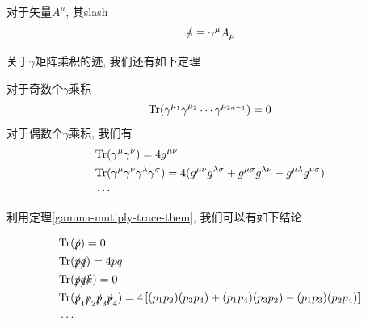 \begin{definition}[Slash]
    对于矢量$A^\mu$, 其slash
    \begin{equation}
        \slashed A\equiv \gamma^\mu A_\mu
    \end{equation}
\end{definition}

关于$\gamma$矩阵乘积的迹, 我们还有如下定理\cite{griffthsClifford}
\begin{theorem}\label{gamma-mutiply-trace-them}
    对于奇数个$\gamma$乘积
    \begin{equation}
        \rm{Tr}(\gamma^{\mu_1}\gamma^{\mu_2}\cdots\gamma^{\mu_{2n-1}})=0
    \end{equation}
    对于偶数个$\gamma$乘积, 我们有
    \begin{align}
        &\rm{Tr}(\gamma^\mu\gamma^\nu)=4g^{\mu\nu}\\
        &\rm{Tr}(\gamma^\mu\gamma^\nu\gamma^\lambda\gamma^\sigma)=4(g^{\mu\nu}g^{\lambda\sigma}+g^{\mu\sigma}g^{\lambda\nu}-g^{\mu\lambda}g^{\nu\sigma})\\
        &\cdots\notag
    \end{align}
\end{theorem}

利用定理\ref{gamma-mutiply-trace-them}, 我们可以有如下结论
\begin{theorem}
    \begin{align}
        &\rm{Tr}(\slashed p)=0\\
        &\rm{Tr}(\slashed p\slashed q)=4pq\\
        &\rm{Tr}(\slashed p\slashed q\slashed k)=0\\
        &\rm{Tr}(\slashed p_1\slashed p_2\slashed p_3\slashed p_4)=4\left[(p_1p_2)(p_3p_4)+(p_1p_4)(p_3p_2)-(p_1p_3)(p_2p_4)\right]\\
        &\cdots\notag
    \end{align}
\end{theorem}

